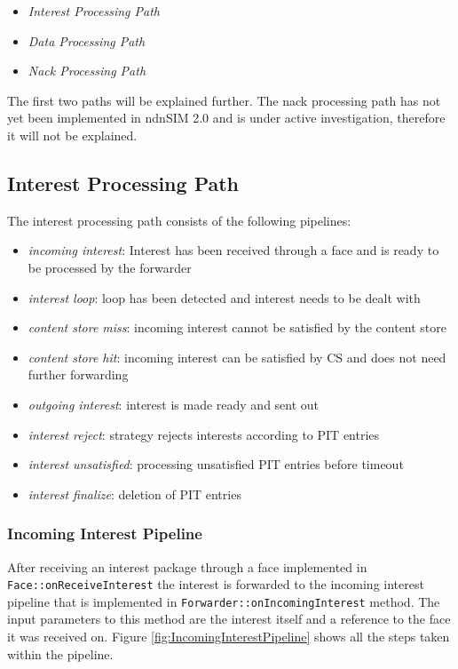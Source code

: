 \begin{itemize}
\item \emph{Interest Processing Path}
\item \emph{Data Processing Path}
\item \emph{Nack Processing Path}
\end{itemize}

The first two paths will be explained further. The nack processing path has not yet been implemented in ndnSIM 2.0 and is under active investigation, therefore it will not be explained.

\subsection{Interest Processing Path}

The interest processing path consists of the following pipelines:

\begin{itemize}
\item \emph{incoming interest}: Interest has been received through a face and is ready to be processed by the forwarder
\item \emph{interest loop}: loop has been detected and interest needs to be dealt with
\item \emph{content store miss}: incoming interest cannot be satisfied by the content store
\item \emph{content store hit}: incoming interest can be satisfied by CS and does not need further forwarding 
\item \emph{outgoing interest}: interest is made ready and sent out
\item \emph{interest reject}: strategy rejects interests according to PIT entries
\item \emph{interest unsatisfied}: processing unsatisfied PIT entries before timeout
\item \emph{interest finalize}: deletion of PIT entries
\end{itemize}

\subsubsection{Incoming Interest Pipeline}

After receiving an interest package through a face implemented in \texttt{Face::onReceiveInterest} the interest is forwarded to the incoming interest pipeline that is implemented in \texttt{Forwarder::onIncomingInterest} method. The input parameters to this method are the interest itself and a reference to the face it was received on. Figure \ref{fig:IncomingInterestPipeline} shows all the steps taken within the pipeline.

